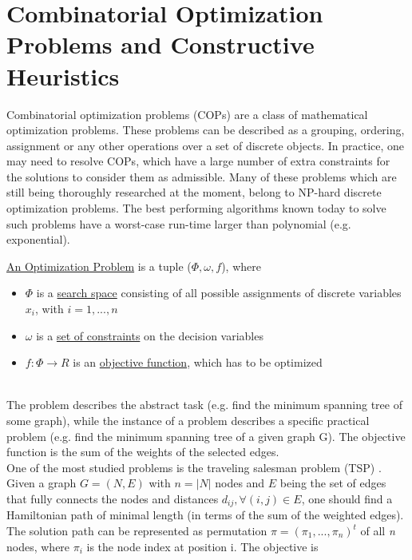 \section{Combinatorial Optimization Problems and Constructive
Heuristics}

Combinatorial optimization problems (COPs) are a class of mathematical optimization problems. These problems can be described as a grouping, ordering, assignment or any other operations over a set of discrete objects. In practice, one may need to resolve COPs, which have a large number of extra constraints for the solutions to consider them as admissible. Many of these problems which are still being thoroughly researched at the moment, belong to NP-hard discrete optimization problems. The best performing algorithms known today to solve such problems have a worst-case run-time larger than polynomial (e.g. exponential).

\begin{minipage}[c, breaklines=true]{0.95\textwidth}
\begin{definition}
	\underline{An Optimization Problem} is a tuple \cite{comb_opt} ($\Phi,\omega, f$), where
	\begin{itemize}
		\item{$\Phi$ is a \underline{search space} consisting of all possible assignments of discrete variables $x_i$, with $i=1,...,n$ }
		\item{$\omega$ is a \underline{set of constraints} on the decision variables}
		\item{$f:\Phi \to R$ is an \underline{objective function}, which has to be optimized}
	\end{itemize}
\end{definition}
\end{minipage} \\

The problem describes the abstract task (e.g. find the minimum spanning tree of some graph), while the instance of a problem describes a specific practical problem (e.g. find the minimum spanning tree of a given graph G). The objective function is the sum of the weights of the selected edges. \\
One of the most studied problems is the traveling salesman problem (TSP) \cite{aco_overview}. Given a graph $G=(N,E)$ with $n=|N|$ nodes and $E$ being the set of edges that fully connects the nodes and distances $d_{ij}, \forall(i,j) \in E$, one should find a Hamiltonian path of minimal length (in terms of the sum of the weighted edges). The solution path can be represented as permutation $\pi=(\pi_1,...,\pi_n)^t$ of all \emph{n} nodes, where $\pi_i$ is the node index at position i. The objective is

